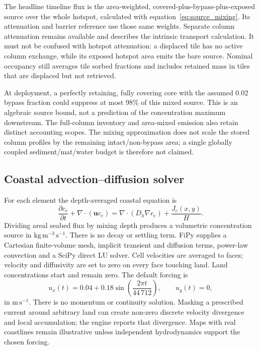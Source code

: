 The headline timeline flux is the area-weighted, covered-plus-bypass-plus-exposed source over the whole hotspot, calculated with equation~\eqref{eq:source_mixing}. Its attenuation and barrier reference use those same weights. Separate column attenuation remains available and describes the intrinsic transport calculation. It must not be confused with hotspot attenuation: a displaced tile has no active column exchange, while its exposed hotspot area emits the bare source. Nominal occupancy still averages tile sorbed fractions and includes retained mass in tiles that are displaced but not retrieved.

At deployment, a perfectly retaining, fully covering core with the assumed 0.02 bypass fraction could suppress at most 98\% of this mixed source. This is an algebraic source bound, not a prediction of the concentration maximum downstream. The full-column inventory and area-mixed emission also retain distinct accounting scopes. The mixing approximation does not scale the stored column profiles by the remaining intact/non-bypass area; a single globally coupled sediment/mat/water budget is therefore not claimed.

\subsection{Coastal advection--diffusion solver}
\label{sec:coastal_solver}

For each element the depth-averaged coastal equation is
\begin{equation}
 \frac{\partial c_e}{\partial t}+\nabla\!\cdot(\boldsymbol{u}c_e)
 =\nabla\!\cdot(D_h\nabla c_e)+\frac{J_e(x,y)}{H}.
 \label{eq:coastal}
\end{equation}
Dividing areal seabed flux by mixing depth produces a volumetric concentration source in $\mathrm{kg\,m^{-3}\,s^{-1}}$. There is no decay or settling term. FiPy supplies a Cartesian finite-volume mesh, implicit transient and diffusion terms, power-law convection and a SciPy direct LU solver.\citep{fipy2009} Cell velocities are averaged to faces; velocity and diffusivity are set to zero on every face touching land. Land concentrations start and remain zero. The default forcing is
\begin{equation}
 u_x(t)=0.04+0.18\sin\left(\frac{2\pi t}{44\,712}\right),
 \qquad u_y(t)=0,
 \label{eq:tidal_forcing}
\end{equation}
in $\mathrm{m\,s^{-1}}$. There is no momentum or continuity solution. Masking a prescribed current around arbitrary land can create non-zero discrete velocity divergence and local accumulation; the engine reports that divergence. Maps with real coastlines remain illustrative unless independent hydrodynamics support the chosen forcing.

